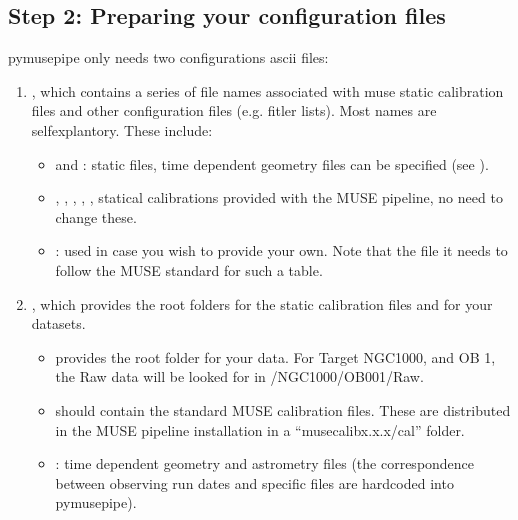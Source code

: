 \documentclass[letterpaper,10pt,english]{sphinxmanual}
\begin{document}
\subsection{Step 2: Preparing your configuration files}
\label{\detokenize{getting_started:step-2-preparing-your-configuration-files}}
\sphinxAtStartPar
pymusepipe only needs two configurations ascii files:
\begin{enumerate}
%
\item {} 
\sphinxAtStartPar
{}, which contains a series of file names associated
with muse static calibration files and other configuration files (e.g. fitler lists). Most
names are self\sphinxhyphen{}explantory. These include:
\begin{itemize}
\item {} 
\sphinxAtStartPar
{} and : static files, time dependent geometry files can be specified
(see ).

\item {} 
\sphinxAtStartPar
{}, , , , ,
statical calibrations provided with the MUSE pipeline, no need to change these.

\item {} 
\sphinxAtStartPar
{} : used in case you wish to provide your own. Note that the file it needs
to follow the MUSE standard for such a table.

\end{itemize}

\item {} 
\sphinxAtStartPar
{}, which provides the root folders for the static calibration files and for your datasets.
\begin{itemize}
\item {} 
\sphinxAtStartPar
{} provides the root folder for your data. For Target NGC1000, and OB 1,
the Raw data will be looked for in /NGC1000/OB001/Raw.

\item {} 
\sphinxAtStartPar
{} should contain the standard MUSE calibration files.
These are distributed in the MUSE pipeline installation in a “muse\sphinxhyphen{}calib\sphinxhyphen{}x.x.x/cal” folder.

\item {} 
\sphinxAtStartPar
{}: time dependent geometry and astrometry files (the correspondence
between observing run dates and specific files are hard\sphinxhyphen{}coded into pymusepipe).

\end{itemize}

\end{enumerate}
\end{document}
